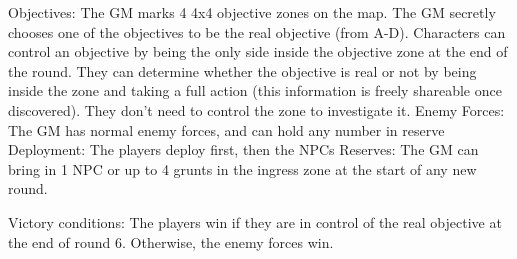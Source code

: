 Objectives: The GM marks 4 4x4 objective zones on the map. The GM secretly chooses one of
the objectives to be the real objective (from A-D). Characters can control an objective by being the
only side inside the objective zone at the end of the round. They can determine whether the
objective is real or not by being inside the zone and taking a full action (this information is freely
shareable once discovered). They don’t need to control the zone to investigate it.
Enemy Forces: The GM has normal enemy forces, and can hold any number in reserve
Deployment: The players deploy first, then the NPCs
Reserves: The GM can bring in 1 NPC or up to 4 grunts in the ingress zone at the start of any
new round.




Victory conditions: The players win if they are in control of the real objective at the end of round
6. Otherwise, the enemy forces win.

